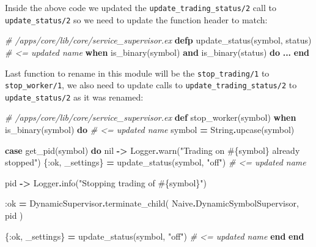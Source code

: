 \documentclass[
]{book}
\newenvironment{Shaded}{\begin{snugshade}}{\end{snugshade}}
\newcommand{\CommentTok}[1]{\textcolor[rgb]{0.56,0.35,0.01}{\textit{#1}}}
\newcommand{\ConstantTok}[1]{\textcolor[rgb]{0.00,0.00,0.00}{#1}}
\newcommand{\KeywordTok}[1]{\textcolor[rgb]{0.13,0.29,0.53}{\textbf{#1}}}
\newcommand{\NormalTok}[1]{#1}
\newcommand{\OperatorTok}[1]{\textcolor[rgb]{0.81,0.36,0.00}{\textbf{#1}}}
\newcommand{\OtherTok}[1]{\textcolor[rgb]{0.56,0.35,0.01}{#1}}
\newcommand{\StringTok}[1]{\textcolor[rgb]{0.31,0.60,0.02}{#1}}
\newcommand{\VariableTok}[1]{\textcolor[rgb]{0.00,0.00,0.00}{#1}}
\begin{document}
Inside the above code we updated the \texttt{update\_trading\_status/2} call to \texttt{update\_status/2} so we need to update the function header to match:

\begin{Shaded}
\begin{Highlighting}[]
  \CommentTok{\# /apps/core/lib/core/service\_supervisor.ex}
  \KeywordTok{defp}\NormalTok{ update\_status(symbol, status) }\CommentTok{\# \textless{}= updated name}
      \KeywordTok{when}\NormalTok{ is\_binary(symbol) }\KeywordTok{and}\NormalTok{ is\_binary(status) }\KeywordTok{do}
     \OperatorTok{...}
  \KeywordTok{end}
\end{Highlighting}
\end{Shaded}

Last function to rename in this module will be the \texttt{stop\_trading/1} to \texttt{stop\_worker/1}, we also need to update calls to \texttt{update\_trading\_status/2} to \texttt{update\_status/2} as it was renamed:

\begin{Shaded}
\begin{Highlighting}[]
  \CommentTok{\# /apps/core/lib/core/service\_supervisor.ex}
  \KeywordTok{def}\NormalTok{ stop\_worker(symbol) }\KeywordTok{when}\NormalTok{ is\_binary(symbol) }\KeywordTok{do} \CommentTok{\# \textless{}= updated name}
\NormalTok{    symbol }\OperatorTok{=} \ConstantTok{String}\OperatorTok{.}\NormalTok{upcase(symbol)}

    \KeywordTok{case}\NormalTok{ get\_pid(symbol) }\KeywordTok{do}
      \ConstantTok{nil} \OperatorTok{{-}\textgreater{}}
        \ConstantTok{Logger}\OperatorTok{.}\NormalTok{warn(}\StringTok{"Trading on }\OtherTok{\#\{}\NormalTok{symbol}\OtherTok{\}}\StringTok{ already stopped"}\NormalTok{)}
\NormalTok{        \{}\VariableTok{:ok}\NormalTok{, \_settings\} }\OperatorTok{=}\NormalTok{ update\_status(symbol, }\StringTok{"off"}\NormalTok{) }\CommentTok{\# \textless{}= updated name}

\NormalTok{      pid }\OperatorTok{{-}\textgreater{}}
        \ConstantTok{Logger}\OperatorTok{.}\NormalTok{info(}\StringTok{"Stopping trading of }\OtherTok{\#\{}\NormalTok{symbol}\OtherTok{\}}\StringTok{"}\NormalTok{)}

        \VariableTok{:ok} \OperatorTok{=}
          \ConstantTok{DynamicSupervisor}\OperatorTok{.}\NormalTok{terminate\_child(}
            \ConstantTok{Naive}\OperatorTok{.}\ConstantTok{DynamicSymbolSupervisor}\NormalTok{,}
\NormalTok{            pid}
\NormalTok{          )}

\NormalTok{        \{}\VariableTok{:ok}\NormalTok{, \_settings\} }\OperatorTok{=}\NormalTok{ update\_status(symbol, }\StringTok{"off"}\NormalTok{) }\CommentTok{\# \textless{}= updated name}
    \KeywordTok{end}
  \KeywordTok{end}
\end{Highlighting}
\end{Shaded}
\end{document}
